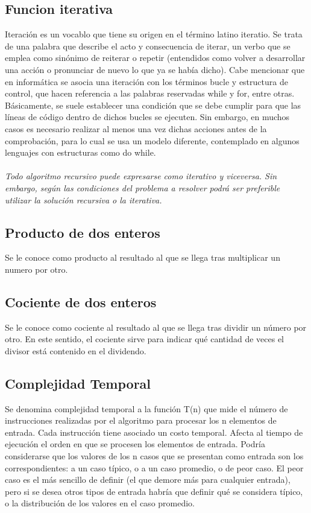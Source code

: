 \documentclass[12pt,twoside]{article}
\begin{document}
\subsection{Funci\´on iterativa}
Iteración es un vocablo que tiene su origen en el término latino iteratio. Se trata de una palabra que describe el acto y consecuencia de iterar, un verbo que se emplea como sinónimo de reiterar o repetir (entendidos como volver a desarrollar una acción
o pronunciar de nuevo lo que ya se había dicho).
Cabe mencionar que en informática se asocia una iteración con los términos bucle y estructura de control, que hacen referencia a las palabras reservadas while y for, entre otras. Básicamente, se suele
establecer una condición que se debe cumplir para que las líneas de código dentro de dichos bucles se ejecuten. Sin embargo, en muchos casos es necesario realizar al menos una vez dichas acciones antes
de la comprobación, para lo cual se usa un modelo diferente, contemplado en algunos lenguajes con estructuras como do while.\\ \\
\textit{Todo algoritmo recursivo puede expresarse como iterativo y
viceversa. Sin embargo, según las condiciones del problema a
resolver podrá ser preferible utilizar la solución recursiva o la
iterativa.}
\subsection{Producto de dos enteros}
Se le conoce c\´omo producto al resultado al que se llega tras multiplicar un n\´umero por otro.
\subsection{Cociente de dos enteros}
Se le conoce c\´omo cociente al resultado al que se llega tras dividir un número por otro. En este sentido, el cociente sirve para indicar qué cantidad de veces el divisor está contenido en el dividendo.
\subsection{Complejidad Temporal}
Se denomina complejidad temporal a la función T(n) que mide el número de instrucciones realizadas por el algoritmo para procesar los n elementos de entrada.
Cada instrucción tiene asociado un costo temporal.
Afecta al tiempo de ejecución el orden en que se procesen los elementos de entrada. Podría considerarse que los valores de los n casos que se presentan como entrada son los correspondientes: a un caso típico, o a un caso promedio, o de peor caso. El peor caso es el más sencillo de definir (el que demore más para cualquier entrada), pero si se desea otros tipos de
entrada habría que definir qué se considera típico, o la distribución de los valores en el caso
promedio.
\end{document}
